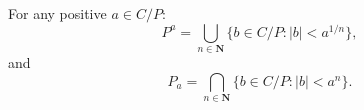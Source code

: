 For any positive $a \in C/P$:
$$P^a = \bigcup_{n \in \mathbf{N}} \{b \in C/P: |b| < a^{1/n}\},$$
and
$$P_a = \bigcap_{n \in \mathbf{N}} \{b \in C/P: |b| < a^n\}.$$
